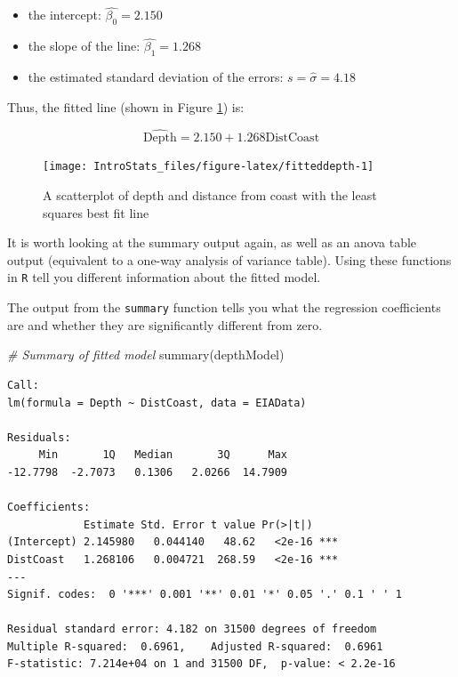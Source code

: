 \documentclass[
  oneside]{krantz}
\newenvironment{Shaded}{\begin{snugshade}}{\end{snugshade}}
\newcommand{\CommentTok}[1]{\textcolor[rgb]{0.56,0.35,0.01}{\textit{#1}}}
\newcommand{\FunctionTok}[1]{\textcolor[rgb]{0.00,0.00,0.00}{#1}}
\newcommand{\NormalTok}[1]{#1}
\providecommand{\tightlist}{%
  \setlength{\itemsep}{0pt}\setlength{\parskip}{0pt}}
\begin{document}
\begin{itemize}
\tightlist
\item
  the intercept: \(\hat{\beta_0}=2.150\)
\item
  the slope of the line: \(\hat{\beta_1}= 1.268\)
\item
  the estimated standard deviation of the errors: \(s = \hat{\sigma}=4.18\)
\end{itemize}

Thus, the fitted line (shown in Figure \ref{fig:fitteddepth}) is:

\[\hat{\textrm{Depth}} = 2.150 + 1.268\textrm{DistCoast}\]

\begin{figure}

{\centering \texttt{[image: IntroStats\_files/figure-latex/fitteddepth-1]} 

}

\caption{A scatterplot of depth and distance from coast with the least squares best fit line}\label{fig:fitteddepth}
\end{figure}

It is worth looking at the summary output again, as well as an anova table output (equivalent to a one-way analysis of variance table). Using these functions in \texttt{R} tell you different information about the fitted model.

The output from the \texttt{summary} function tells you what the regression coefficients are and whether they are significantly different from zero.

\begin{Shaded}
\begin{Highlighting}[]
\CommentTok{\# Summary of fitted model}
\FunctionTok{summary}\NormalTok{(depthModel)}
\end{Highlighting}
\end{Shaded}

\begin{verbatim}
Call:
lm(formula = Depth ~ DistCoast, data = EIAData)

Residuals:
     Min       1Q   Median       3Q      Max 
-12.7798  -2.7073   0.1306   2.0266  14.7909 

Coefficients:
            Estimate Std. Error t value Pr(>|t|)    
(Intercept) 2.145980   0.044140   48.62   <2e-16 ***
DistCoast   1.268106   0.004721  268.59   <2e-16 ***
---
Signif. codes:  0 '***' 0.001 '**' 0.01 '*' 0.05 '.' 0.1 ' ' 1

Residual standard error: 4.182 on 31500 degrees of freedom
Multiple R-squared:  0.6961,    Adjusted R-squared:  0.6961 
F-statistic: 7.214e+04 on 1 and 31500 DF,  p-value: < 2.2e-16
\end{verbatim}
\end{document}
